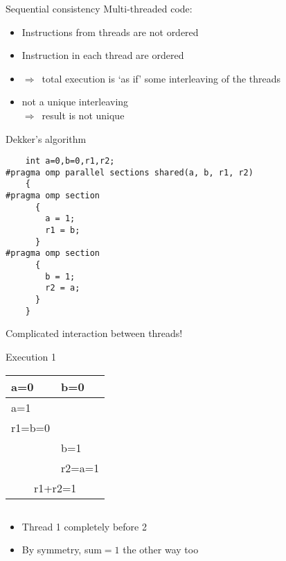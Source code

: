 
\begin{numberedframe}{Sequential consistency}
  Multi-threaded code:
  \begin{itemize}
  \item Instructions from threads are not ordered
  \item Instruction in each thread are ordered
  \item $\Rightarrow$~total execution is `as if'
    some interleaving of the threads
  \item not a unique interleaving\\
    $\Rightarrow$~result is not unique
  \end{itemize}
\end{numberedframe}

\begin{numberedframe}{Dekker's algorithm}
\begin{lstlisting}
    int a=0,b=0,r1,r2;
#pragma omp parallel sections shared(a, b, r1, r2)
    {
#pragma omp section
      {
        a = 1;
        r1 = b;
      }
#pragma omp section
      {
        b = 1;
        r2 = a;
      }
    }
\end{lstlisting}
Complicated interaction between threads!
\end{numberedframe}

\begin{numberedframe}{Execution 1}
  \begin{tabular}{|l|l|}
    \hline
    a=0&b=0\\ \hline
    a=1&\\
    r1=b=0&\\
    &b=1\\
    &r2=a=1\\ \hline
    \multicolumn{2}{|c|}{r1+r2=1}\\
    \hline
  \end{tabular}
\begin{lstlisting}
\end{lstlisting}
  \begin{itemize}
  \item Thread 1 completely before 2
  \item By symmetry, sum$=1$ the other way too
  \end{itemize}
\end{numberedframe}

